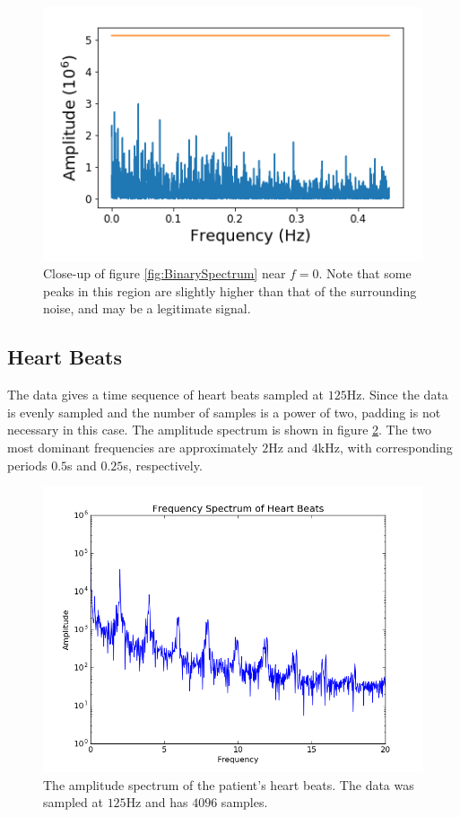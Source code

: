 \message{ !name(Assn2.tex)}\documentclass[twocolumn]{article}
\begin{document}
\begin{figure}
\centering
\includegraphics[width=\linewidth]{binaryZoom}
\caption{Close-up of figure \ref{fig:BinarySpectrum} near $f=0$. Note that some peaks in this region are slightly higher than that of the surrounding noise, and may be a legitimate signal.}
\label{fig:binaryZoom}
\end{figure}

\subsection{Heart Beats}
The data gives a time sequence of heart beats sampled at $125$Hz. Since the data
is evenly sampled and the number of samples is a power of two, padding is not
necessary in this case. The amplitude spectrum is shown in figure
\ref{fig:beats}. The two most dominant frequencies are approximately $2$Hz and
$4$kHz, with corresponding periods $0.5$s and $0.25$s, respectively.

\begin{figure}
  \includegraphics[width=\linewidth]{beats.png}
  \caption{
    The amplitude spectrum of the patient's heart beats. The data was sampled at
    $125$Hz and has $4096$ samples.
  }
  \label{fig:beats}
\end{figure}
\end{document}
